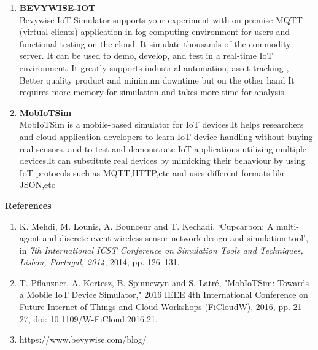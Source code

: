 \documentclass[a4paper,11pt]{article}
\begin{document}
\begin{iotsolution}
\begin{enumerate}[1]
\item{\textbf{BEVYWISE-IOT}}\\
Bevywise IoT Simulator supports your experiment with
on-premise MQTT (virtual clients) application in fog
computing environment for users and functional testing
on the cloud. It simulate thousands of the commodity server. It can
be used to demo, develop, and test in a real-time IoT
environment. It greatly supports industrial automation, asset tracking , Better quality product and minimum downtime but on the other hand It requires more memory for simulation and takes more time for analysis.

\item{\textbf{MobIoTSim}}\\
MobIoTSim is a mobile-based simulator for IoT devices.It helps researchers and cloud application
developers to learn IoT device handling without buying
real sensors, and to test and demonstrate IoT applications
utilizing multiple devices.It can substitute real devices by mimicking their behaviour by using IoT protocols such as MQTT,HTTP,etc and uses different formats like JSON,etc


\end{enumerate}
\vspace{1cm}
\textbf{References}
\begin{enumerate}[1]
    \item K. Mehdi, M. Lounis, A. Bounceur and T. Kechadi,
‘Cupcarbon: A multi-agent and discrete event wireless
sensor network design and simulation tool’, in \emph{7th
International ICST Conference on Simulation Tools and
Techniques, Lisbon, Portugal, 2014}, 2014, pp. 126–131.
    \item T. Pflanzner, A. Kertesz, B. Spinnewyn and S. Latré, "MobIoTSim: Towards a Mobile IoT Device Simulator," 2016 IEEE 4th International Conference on Future Internet of Things and Cloud Workshops (FiCloudW), 2016, pp. 21-27, doi: 10.1109/W-FiCloud.2016.21.
    \item https://www.bevywise.com/blog/
\end{enumerate}

\end{iotsolution}
\end{document}
